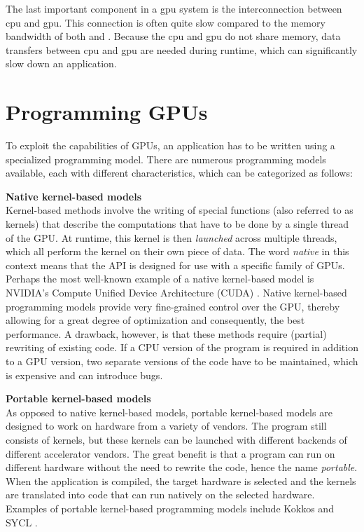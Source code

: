 The last important component in a \acrshort{gpu} system is the interconnection between \acrshort{cpu} and \acrshort{gpu}. This connection is often quite slow compared to the memory bandwidth of both  and . Because the \acrshort{cpu} and \acrshort{gpu} do not share memory, data transfers between \acrshort{cpu} and \acrshort{gpu} are needed during runtime, which can significantly slow down an application.

\newpage
\section{Programming GPUs} \label{sec:programming_gpus}
To exploit the capabilities of GPUs, an application has to be written using a specialized programming model. There are numerous programming models available, each with different characteristics, which can be categorized as follows:

\textbf{Native kernel-based models} \\
Kernel-based methods involve the writing of special functions (also referred to as kernels) that describe the computations that have to be done by a single thread of the GPU.  At runtime, this kernel is then \emph{launched} across multiple threads, which all perform the kernel on their own piece of data. The word \emph{native} in this context means that the API is designed for use with a specific family of GPUs. Perhaps the most well-known example of a native kernel-based model is NVIDIA's Compute Unified Device Architecture (CUDA) \citep{dallyEvolutionGraphicsProcessing2021}. Native kernel-based programming models provide very fine-grained control over the GPU, thereby allowing for a great degree of optimization and consequently, the best performance. A drawback, however, is that these methods require (partial) rewriting of existing code. If a CPU version of the program is required in addition to a GPU version, two separate versions of the code have to be maintained, which is expensive and can introduce bugs.

\textbf{Portable kernel-based models} \\
As opposed to native kernel-based models, portable kernel-based models are designed to work on hardware from a variety of vendors. The program still consists of kernels, but these kernels can be launched with different backends of different accelerator vendors. The great benefit is that a program can run on different hardware without the need to rewrite the code, hence the name \emph{portable}. When the application is compiled, the target hardware is selected and the kernels are translated into code that can run natively on the selected hardware. Examples of portable kernel-based programming models include Kokkos \citep{trottKokkosProgrammingModel2022} and SYCL \citep{khronosgroupSYCL2020Specification2023}.

